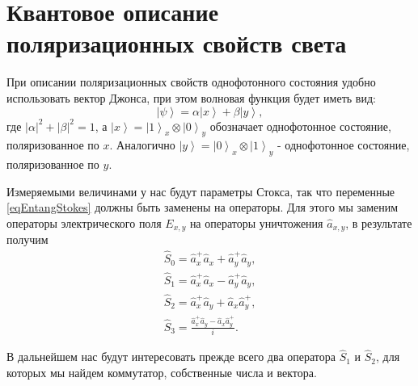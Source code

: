 \section{Квантовое описание поляризационных свойств света}
При описании поляризационных свойств однофотонного состояния удобно
использовать вектор Джонса, при этом волновая функция будет иметь вид:
\begin{equation}
\left|\psi\right> = 
\alpha \left|x\right> + 
\beta \left|y\right>,
\label{eqEntangSimpleState}
\end{equation}
где $\left|\alpha\right|^2 + \left|\beta\right|^2 = 1$, а
$\left|x\right> = \left|1\right>_x\otimes\left|0\right>_y$ обозначает
однофотонное состояние, поляризованное по $x$. Аналогично 
$\left|y\right> = \left|0\right>_x\otimes\left|1\right>_y$ -
однофотонное состояние, поляризованное по $y$. 

Измеряемыми величинами у нас будут параметры Стокса, так что переменные
\eqref{eqEntangStokes} должны быть заменены на операторы. Для этого мы
заменим операторы электрического поля $E_{x,y}$ на операторы
уничтожения $\hat{a}_{x,y}$, в результате получим
\begin{eqnarray}
\hat{S}_0 = \hat{a}_x^{+} \hat{a}_x + \hat{a}_y^{+} \hat{a}_y,
\nonumber \\
\hat{S}_1 = \hat{a}_x^{+} \hat{a}_x - \hat{a}_y^{+} \hat{a}_y,
\nonumber \\
\hat{S}_2 = \hat{a}_x^{+} \hat{a}_y + \hat{a}_x \hat{a}_y^{+},
\nonumber \\
\hat{S}_3 = \frac{\hat{a}_x^{+} \hat{a}_y - \hat{a}_x \hat{a}_y^{+}}{i}.
\label{eqEntangStokesOper}
\end{eqnarray}

В дальнейшем нас будут интересовать прежде всего два оператора
$\hat{S}_1$ и $\hat{S}_2$, для которых мы найдем коммутатор,
собственные числа и вектора.

